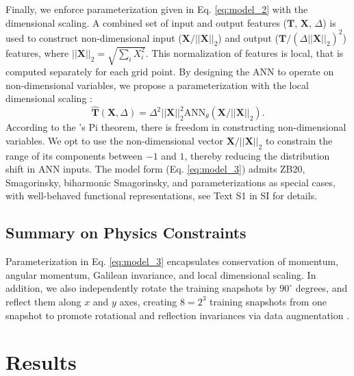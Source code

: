 \documentclass[draft]{agujournal2019}
\begin{document}
Finally, we enforce parameterization given in Eq. \eqref{eq:model_2} with the dimensional scaling. A combined set of input and output features ($\mathbf{T}$, $\mathbf{X}$, $\Delta$) is used to construct non-dimensional input ($\mathbf{X} / ||\mathbf{X}||_2$) and output ($\mathbf{T} / (\Delta ||\mathbf{X}||_2)^2$) features, where $||\mathbf{X}||_2= \sqrt{\sum_i X_i^2}$. This normalization of features is local, that is computed separately for each grid point. By designing the ANN to operate on non-dimensional variables, we propose a parameterization with the local dimensional scaling \cite{reissmann2021application, prakash2022invariant}:
\begin{equation}
    \widehat{\mathbf{T}}(\mathbf{X}, \Delta) = \Delta^2 ||\mathbf{X}||_2^2 \mathrm{ANN}_{\theta} (\mathbf{X} / ||\mathbf{X}||_2). \label{eq:model_3}
\end{equation}
According to the 's Pi theorem, there is freedom in constructing non-dimensional variables. We opt to use the non-dimensional vector $\mathbf{X} / ||\mathbf{X}||_2$ to constrain the range of its components between $-1$ and $1$, thereby reducing the distribution shift in ANN inputs. The model form (Eq. \eqref{eq:model_3}) admits ZB20, Smagorinsky, biharmonic Smagorinsky, and  parameterizations as special cases, with well-behaved functional representations, see Text S1 in SI for details.

\subsection{Summary on Physics Constraints}
Parameterization in Eq. \eqref{eq:model_3} encapsulates conservation of momentum, angular momentum, Galilean invariance, and local dimensional scaling. %
In addition, we also independently rotate the training snapshots by $90^\circ$ degrees, and reflect them along $x$ and $y$ axes, creating $8=2^3$ training snapshots from one snapshot to promote rotational and reflection invariances via data augmentation \cite{guan2022learning}.



\section{Results}
\end{document}
